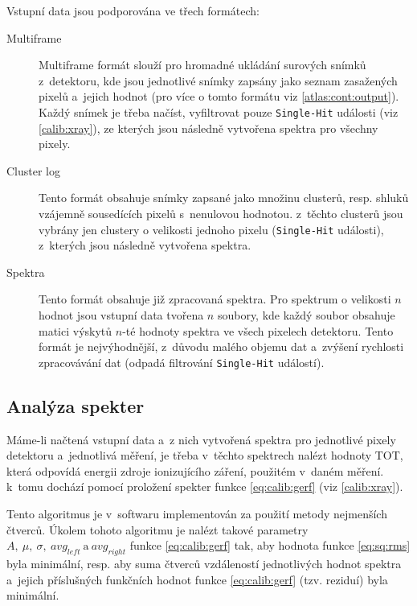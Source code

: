 Vstupní data jsou podporována ve třech formátech:
\begin{description}
	\item[Multiframe] Multiframe formát slouží pro hromadné ukládání surových snímků z~detektoru, kde jsou jednotlivé snímky zapsány jako seznam zasažených pixelů a~jejich hodnot (pro více o tomto formátu viz \ref{atlas:cont:output}). Každý snímek je třeba načíst, vyfiltrovat pouze \texttt{Single-Hit} události (viz \ref{calib:xray}), ze kterých jsou následně vytvořena spektra pro všechny pixely.
	\item[Cluster log] Tento formát obsahuje snímky zapsané jako množinu clusterů, resp. shluků vzájemně sousedících pixelů s~nenulovou hodnotou. z~těchto clusterů jsou vybrány jen clustery o velikosti jednoho pixelu (\texttt{Single-Hit} události), z~kterých jsou následně vytvořena spektra.
	\item[Spektra] Tento formát obsahuje již zpracovaná spektra. Pro spektrum o velikosti $n$ hodnot jsou vstupní data tvořena $n$ soubory, kde každý soubor obsahuje matici výskytů $n$-té hodnoty spektra ve všech pixelech detektoru. Tento formát je nejvýhodnější, z~důvodu malého objemu dat a~zvýšení rychlosti zpracovávání dat (odpadá filtrování \texttt{Single-Hit} událostí).
\end{description}


\subsection{Analýza spekter}\label{calib:sw:spektra}
Máme-li načtená vstupní data a~z nich vytvořená spektra pro jednotlivé pixely detektoru a~jednotlivá měření, je třeba v~těchto spektrech nalézt hodnoty TOT, která odpovídá energii zdroje ionizujícího záření, použitém v~daném měření. k~tomu dochází pomocí proložení spekter funkce \ref{eq:calib:gerf} (viz \ref{calib:xray}). 

Tento algoritmus je v~softwaru implementován za použití metody nejmenších čtverců. Úkolem tohoto algoritmu je nalézt takové parametry $A,~\mu,~\sigma,~avg_{left}~\text{a}~avg_{right}$ funkce \ref{eq:calib:gerf} tak, aby hodnota funkce \ref{eq:sq:rms} byla minimální, resp. aby suma čtverců vzdáleností jednotlivých hodnot spektra a~jejich příslušných funkčních hodnot funkce \ref{eq:calib:gerf} (tzv. reziduí) byla minimální.

